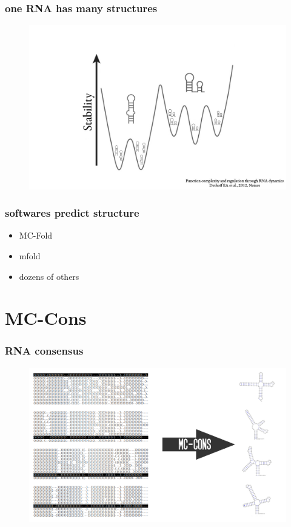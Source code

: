 \documentclass{beamer}
\begin{document}
\begin{frame}
	\frametitle{one RNA has many structures}
	\begin{figure}
	\centering
	\includegraphics[scale=1]{figs/dynamics}
	\end{figure}
\end{frame}


\begin{frame}
	\frametitle{softwares predict structure}

	\begin{itemize}
		\item MC-Fold
		\item mfold
		\item dozens of others
	\end{itemize}
\end{frame}







\section{MC-Cons}

\begin{frame}
	\frametitle{RNA consensus}
	\begin{figure}
	\centering
	\includegraphics[scale=0.8]{figs/problem_setting}
	\end{figure}
\end{frame}
\end{document}
